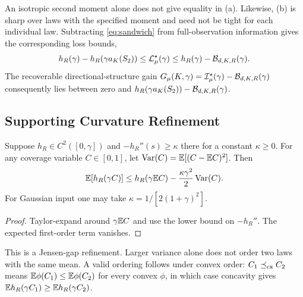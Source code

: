 An isotropic second moment alone does not give equality in (a). Likewise, (b) is sharp over laws with the specified moment and need not be tight for each individual law. Subtracting \eqref{eq:sandwich} from full-observation information gives the corresponding loss bounds,
\begin{equation}
h_R(\gamma)-h_R(\gamma a_K(S_2))\le\mathcal L_\mu^\star(\gamma)
\le h_R(\gamma)-\mathcal B_{d,K,R}(\gamma).
\label{eq:loss_sandwich}
\end{equation}
The recoverable directional-structure gain $G_\mu(K,\gamma)=\mathcal I_\mu^\star(\gamma)-\mathcal B_{d,K,R}(\gamma)$ consequently lies between zero and $h_R(\gamma a_K(S_2))-\mathcal B_{d,K,R}(\gamma)$.

\subsection{Supporting Curvature Refinement}
\begin{proposition}
Suppose $h_R\in C^2([0,\gamma])$ and $-h_R''(s)\ge\kappa$ there for a constant $\kappa\ge0$. For any coverage variable $C\in[0,1]$, let $\operatorname{Var}(C)=\mathbb E[(C-\mathbb E C)^2]$. Then
\begin{equation}
\mathbb E[h_R(\gamma C)]\le h_R(\gamma\mathbb E C)
-\frac{\kappa\gamma^2}{2}\operatorname{Var}(C).
\label{eq:curvature_penalty}
\end{equation}
For Gaussian input one may take $\kappa=1/[2(1+\gamma)^2]$.
\end{proposition}
\begin{proof}
Taylor-expand around $\gamma\mathbb E C$ and use the lower bound on $-h_R''$. The expected first-order term vanishes.
\end{proof}
This is a Jensen-gap refinement. Larger variance alone does not order two laws with the same mean. A valid ordering follows under convex order: $C_1\preceq_{\rm cx}C_2$ means $\mathbb E\phi(C_1)\le\mathbb E\phi(C_2)$ for every convex $\phi$, in which case concavity gives $\mathbb E h_R(\gamma C_1)\ge\mathbb E h_R(\gamma C_2)$.
